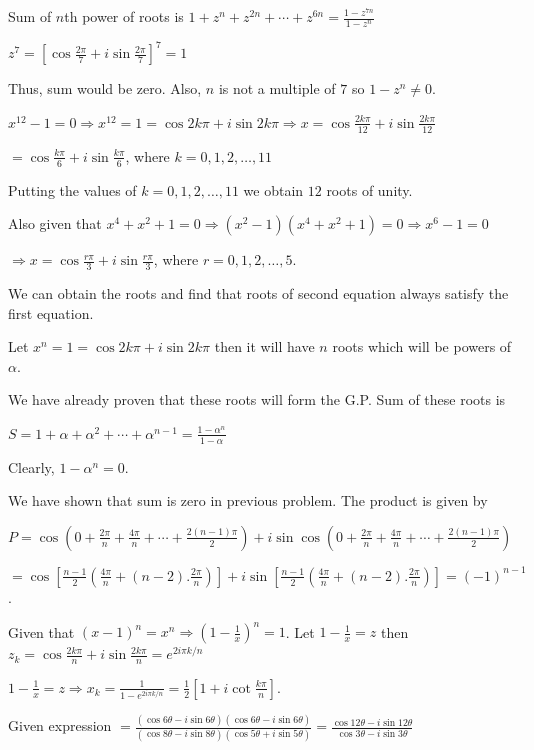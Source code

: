   Sum of $n$th power of roots is $1 + z^n + z^{2n} + \cdots + z^{6n} = \frac{1 - z^{7n}}{1 - z^n}$

  $z^7 = \left[\cos\frac{2\pi}{7} + i\sin\frac{2\pi}{7}\right]^7  = 1$

  Thus, sum would be zero. Also, $n$ is not a multiple of $7$ so $1 - z^n\neq 0$.
\item $x^{12} - 1 = 0\Rightarrow x^{12} = 1 = \cos2k\pi + i\sin2k\pi \Rightarrow x = \cos\frac{2k\pi}{12} +
  i\sin\frac{2k\pi}{12}$

  $= \cos\frac{k\pi}{6} + i\sin\frac{k\pi}{6}$, where $k = 0, 1, 2, \ldots, 11$

  Putting the values of $k = 0, 1, 2, \ldots, 11$ we obtain $12$ roots of unity.

  Also given that $x^4 + x^2 + 1 = 0 \Rightarrow (x^2 - 1)(x^4 + x^2 + 1) = 0 \Rightarrow x^6 - 1 = 0$

  $\Rightarrow x = \cos\frac{r\pi}{3} + i\sin\frac{r\pi}{3}$, where $r = 0, 1, 2, \ldots, 5$.

  We can obtain the roots and find that roots of second equation always satisfy the first equation.
\item Let $x^n = 1 = \cos2k\pi + i\sin2k\pi$ then it will have $n$ roots which will be powers of $\alpha$.

  We have already proven that these roots will form the G.P. Sum of these roots is

  $S = 1 + \alpha + \alpha^2 + \cdots + \alpha^{n- 1} = \frac{1 - \alpha^n}{1 - \alpha}$

  Clearly, $1 - \alpha^n = 0$.
\item We have shown that sum is zero in previous problem. The product is given by

    $P = \cos\left(0 + \frac{2\pi}{n} + \frac{4\pi}{n} + \cdots + \frac{2(n- 1)\pi}{2}\right) + i\sin \cos\left(0
  + \frac{2\pi}{n} + \frac{4\pi}{n} + \cdots + \frac{2(n- 1)\pi}{2}\right)$

  $= \cos\left[\frac{n - 1}{2}\left(\frac{4\pi}{n} + (n - 2).\frac{2\pi}{n}\right)\right] +
  i\sin\left[\frac{n - 1}{2}\left(\frac{4\pi}{n} + (n - 2).\frac{2\pi}{n}\right)\right] = (-1)^{n - 1}$.
\item Given that $(x - 1)^n = x^n\Rightarrow \left(1 - \frac{1}{x}\right)^n = 1$. Let $1 - \frac{1}{x} = z$
  then $z_k = \cos\frac{2k\pi}{n} + i\sin\frac{2k\pi}{n} = e^{2i\pi k/n}$

  $1 - \frac{1}{x} = z \Rightarrow x_k = \frac{1}{1 - e^{2i\pi k/n}} = \frac{1}{2}\left[1 +
    i\cot\frac{k\pi}{n}\right]$.
\item Given expression $= \frac{(\cos6\theta - i\sin6\theta)(\cos6\theta - i\sin6\theta)}{(\cos8\theta -
    i\sin8\theta)(\cos5\theta + i\sin5\theta)} = \frac{\cos12\theta - i\sin12\theta}{\cos3\theta -
    i\sin3\theta}$

